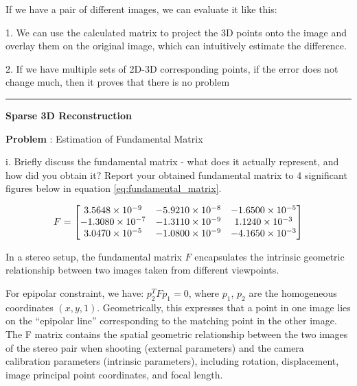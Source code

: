 \documentclass[onecolumn,10pt]{article}
\begin{document}
If we have a pair of different images, we can evaluate it like this:

1. We can use the calculated matrix to project the 3D points onto the image and overlay them on the original image, which can intuitively estimate the difference.

2. If we have multiple sets of 2D-3D corresponding points, if the error does not change much, then it proves that there is no problem

\hrule

\noindent\textbf{Sparse 3D Reconstruction}


\addtocounter{problemnumber}{1}
\noindent\textbf{Problem }:  Estimation of Fundamental Matrix

i. Briefly discuss the fundamental matrix - what does it actually represent, and how did you obtain it? Report your obtained fundamental matrix to 4 significant figures below in equation \ref{eq:fundamental_matrix}.

\begin{align}
F = \begin{bmatrix}
\multicolumn{1}{c}{3.5648 \times 10^{-9}} & \multicolumn{1}{c}{-5.9210 \times 10^{-8}} & \multicolumn{1}{c}{-1.6500 \times 10^{-5}} \\ 
\multicolumn{1}{c}{-1.3080 \times 10^{-7}} & \multicolumn{1}{c}{-1.3110 \times 10^{-9}} & \multicolumn{1}{c}{1.1240 \times 10^{-3}} \\ 
\multicolumn{1}{c}{3.0470 \times 10^{-5}}  & \multicolumn{1}{c}{-1.0800 \times 10^{-9}} & \multicolumn{1}{c}{-4.1650 \times 10^{-3}} \\ 
\end{bmatrix}
\label{eq:fundamental_matrix}
\end{align}


In a stereo setup, the fundamental matrix $F$ encapsulates the intrinsic geometric relationship between two images taken from different viewpoints.

For epipolar constraint, we have: $p_2^T F p_1 = 0$, where $p_1$, $p_2$ are the homogeneous coordinates $(x,y,1)$. Geometrically, this expresses that a point in one image lies on the “epipolar line” corresponding to the matching point in the other image. The F matrix contains the spatial geometric relationship between the two images of the stereo pair when shooting (external parameters) and the camera calibration parameters (intrinsic parameters), including rotation, displacement, image principal point coordinates, and focal length.
\end{document}
